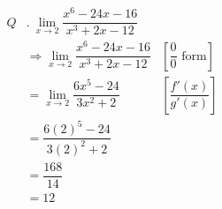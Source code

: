 \large
\ttfamily
\vtitle[Evaluate]

\addtolength{\jot}{3ex}
\begin{align*}
Q &.~\lim_{x\to 2}\dfrac{x^6-24x-16}{x^3+2x-12}\\
	&\Rightarrow \lim_{x\to 2}\dfrac{x^6-24x-16}{x^3+2x-12} &\left[\dfrac{0}{0} \text{ form}\right]\\
	&= \lim_{x\to 2}\dfrac{6x^5-24}{3x^2+2} &\left[\dfrac{f'(x)}{g'(x)}\right]\\
	&=\dfrac{6(2)^5-24}{3(2)^2+2}\\
	&= \dfrac{168}{14}\\
	&=12
\end{align*}

